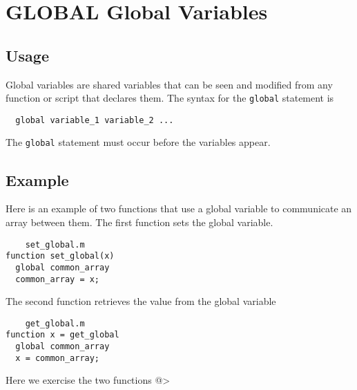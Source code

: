 \section{GLOBAL Global Variables}

\subsection{Usage}

Global variables are shared variables that can be
seen and modified from any function or script that 
declares them.  The syntax for the \verb|global| statement
is
\begin{verbatim}
  global variable_1 variable_2 ...
\end{verbatim}
The \verb|global| statement must occur before the variables
appear.
\subsection{Example}

Here is an example of two functions that use a global
variable to communicate an array between them.  The
first function sets the global variable.
\begin{verbatim}
    set_global.m
function set_global(x)
  global common_array
  common_array = x;
\end{verbatim}
The second function retrieves the value from the global
variable
\begin{verbatim}
    get_global.m
function x = get_global
  global common_array
  x = common_array;
\end{verbatim}
Here we exercise the two functions
@>
